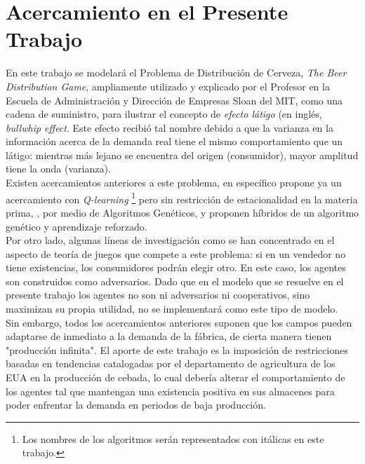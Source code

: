 \section{Acercamiento en el Presente Trabajo}

En este trabajo se modelará el Problema de Distribución de Cerveza, \textit{The Beer Distribution Game}, ampliamente utilizado y explicado por el Profesor \citet{Sterman} en la Escuela de Administraci\'on y Direcci\'on de Empresas Sloan del MIT, como una cadena de suministro, para ilustrar el concepto de \textit{efecto l\'atigo} (en ingl\'es, \textit{bullwhip effect}. Este efecto recibi\'o tal nombre debido a que la varianza en la informaci\'on acerca de la demanda real tiene el mismo comportamiento que un l\'atigo: mientras m\'as lejano se encuentra del origen (consumidor), mayor amplitud tiene la onda (varianza).\\

Existen acercamientos anteriores a este problema, en espec\'ifico \citet{Chaharsooghi} propone ya un acercamiento con \textit{Q-learning} \footnote{Los nombres de los algoritmos ser\'an representados con it\'alicas en este trabajo.} pero sin restricci\'on de estacionalidad en la materia prima, \citet{Strozzi}, por medio de Algoritmos Genéticos, \citet{Kimbrough} y \citet{Zarandi} proponen h\'ibridos de un algoritmo gen\'etico y aprendizaje reforzado.\\

Por otro lado, algunas l\'ineas de investigaci\'on como \citet{Busoniu} se han concentrado en el aspecto de teor\'ia de juegos que compete a este problema: si en un vendedor no tiene existencias, los consumidores podr\'an elegir otro. En este caso, los agentes son construidos como adversarios. Dado que en el modelo que se resuelve en el presente trabajo los agentes no son ni adversarios ni cooperativos, sino maximizan su propia utilidad, no se implementar\'a como este tipo de modelo.\\

Sin embargo, todos los acercamientos anteriores suponen que los campos pueden adaptarse de inmediato a la demanda de la f\'abrica, de cierta manera tienen "producci\'on infinita". El aporte de este trabajo es la imposici\'on de restricciones basadas en tendencias catalogadas por el departamento de agricultura de los EUA en la producci\'on de cebada, lo cual deber\'ia alterar el comportamiento de los agentes tal que mantengan una existencia positiva en sus almacenes para poder enfrentar la demanda en periodos de baja producci\'on.
